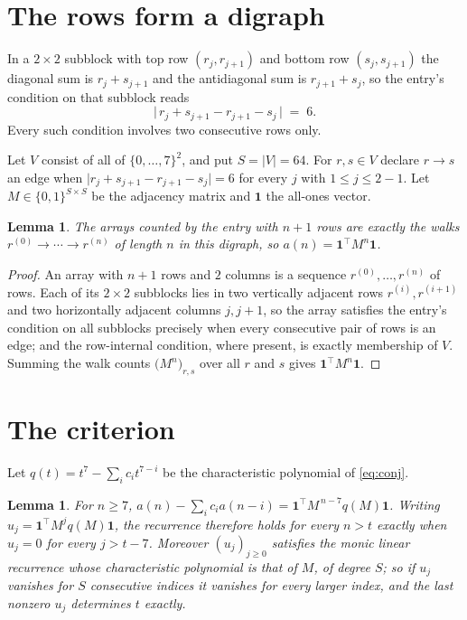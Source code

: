 \documentclass[11pt,a4paper]{article}
\theoremstyle{plain}
\newtheorem{lemma}[theorem]{Lemma}
\theoremstyle{definition}
\begin{document}
\section{The rows form a digraph}

In a $2\times2$ subblock with top row $(r_j,r_{j+1})$ and bottom row $(s_j,s_{j+1})$ the
diagonal sum is $r_j+s_{j+1}$ and the antidiagonal sum is $r_{j+1}+s_j$, so the entry's
condition on that subblock reads
\[
\bigl|\,r_j+s_{j+1}-r_{j+1}-s_j\,\bigr|\;=\;6.
\]
Every such condition involves two consecutive rows only.

Let $V$ consist of all of $\{0,\dots,7\}^{2}$, and put $S=|V|=64$. For $r,s\in V$ declare $r\to s$ an edge
when $\bigl|r_j+s_{j+1}-r_{j+1}-s_j\bigr|=6$ for every $j$ with
$1\le j\le2-1$. Let $M\in\{0,1\}^{S\times S}$ be the adjacency matrix and $\mathbf{1}$
the all-ones vector.

\begin{lemma}\label{lem:walk}
The arrays counted by the entry with $n+1$ rows are exactly the walks
$r^{(0)}\to\cdots\to r^{(n)}$ of length $n$ in this digraph, so
$a(n)=\mathbf{1}^{\!\top}M^{n}\mathbf{1}$.
\end{lemma}

\begin{proof}
An array with $n+1$ rows and $2$ columns is a sequence $r^{(0)},\dots,r^{(n)}$ of
rows. Each of its $2\times2$ subblocks lies in two vertically adjacent rows
$r^{(i)},r^{(i+1)}$ and two horizontally adjacent columns $j,j+1$, so the array satisfies
the entry's condition on all subblocks precisely when every consecutive pair of rows is an
edge; and the row-internal condition, where present, is exactly membership of $V$. Summing
the walk counts $\bigl(M^{n}\bigr)_{r,s}$ over all $r$ and $s$ gives
$\mathbf{1}^{\!\top}M^{n}\mathbf{1}$.
\end{proof}

\section{The criterion}

Let $q(t)=t^{7}-\sum_i c_i t^{7-i}$ be the characteristic polynomial of
\eqref{eq:conj}.

\begin{lemma}\label{lem:crit}
For $n\ge7$,
$a(n)-\sum_i c_i a(n-i)=\mathbf{1}^{\!\top}M^{\,n-7}q(M)\mathbf{1}$. Writing
$u_j=\mathbf{1}^{\!\top}M^{j}q(M)\mathbf{1}$, the recurrence therefore holds for every
$n>t$ exactly when $u_j=0$ for every $j>t-7$. Moreover $(u_j)_{j\ge0}$ satisfies the
monic linear recurrence whose characteristic polynomial is that of $M$, of degree $S$; so
if $u_j$ vanishes for $S$ consecutive indices it vanishes for every larger index, and the
last nonzero $u_j$ determines $t$ exactly.
\end{lemma}
\end{document}
